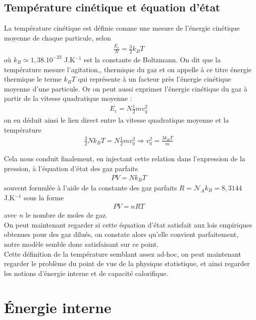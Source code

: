 \documentclass[12pt,prb,aps,epsf]{article}
\begin{document}
\subsection{Température cinétique et équation d'état}
La température cinétique est définie comme une mesure de l'énergie cinétique moyenne de chaque particule, selon 
\begin{eqnarray}
\frac{E_c}{N} = \frac{3}{2}k_BT
\end{eqnarray}
où $k_B \simeq 1,38.10^{-23}$ J.K$^{-1}$ est la constante de Boltzmann. On dit que la température mesure l'agitation,, thermique du gaz et on appelle à ce titre énergie thermique le terme $k_BT$ qui représente à un facteur près l'énergie cinétique moyenne d'une particule. Or on peut aussi exprimer l'énergie cinétique du gaz à partir de la vitesse quadratique moyenne :
\begin{eqnarray}
E_c = N\frac{1}{2} m v_q^2
\end{eqnarray}
on en déduit ainsi le lien direct entre la vitesse quadratique moyenne et la température
\begin{eqnarray}
\frac{3}{2}N k_B T = N\frac{1}{2} m v_q^2 \Rightarrow v_q^2 = \frac{3k_BT}{m}
\end{eqnarray}
 
Cela nous conduit finalement, en injectant cette relation dans l'expression de la pression, à l'équation d'état des gaz parfaits 
\begin{eqnarray}
PV = N k_B T
\end{eqnarray}
souvent formulée à l'aide de la constante des gaz parfaits $R = \mathcal{N}_A k_B = 8,3144$ J.K$^{-1}$ sous la forme 
\begin{eqnarray}
PV = nRT
\end{eqnarray}
avec $n$ le nombre de moles de gaz.\\

On peut maintenant regarder si cette équation d'état satisfait aux lois empiriques obtenues pour des gaz dilués, on constate alors qu'elle convient parfaitement, notre modèle semble donc satisfaisant sur ce point.\\

Cette définition de la température semblant assez ad-hoc, on peut maintenant regarder le problème du point de vue de la physique statistique, et ainsi regarder les notions d'énergie interne et de capacité calorifique.

\section{Énergie interne}
\end{document}
